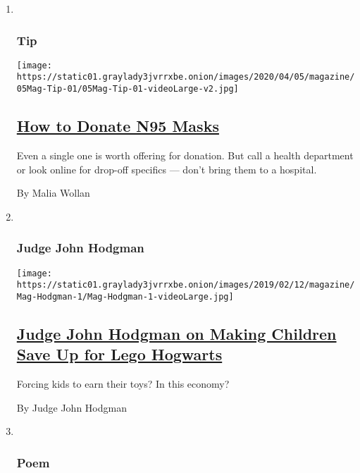 \begin{enumerate}
\def\labelenumi{\arabic{enumi}.}
\item ~
  \hypertarget{tip}{%
  \subsubsection{Tip}\label{tip}}

  \texttt{[image: https://static01.graylady3jvrrxbe.onion/images/2020/04/05/magazine/05Mag-Tip-01/05Mag-Tip-01-videoLarge-v2.jpg]}

  \hypertarget{how-to-donate-n95-masks}{%
  \subsection{\texorpdfstring{\href{/2020/03/30/magazine/how-to-donate-n95-masks-coronavirus.html}{How
  to Donate N95
  Masks}}{How to Donate N95 Masks}}\label{how-to-donate-n95-masks}}

  Even a single one is worth offering for donation. But call a health
  department or look online for drop-off specifics --- don't bring them
  to a hospital.

  By Malia Wollan
\item ~
  \hypertarget{judge-john-hodgman}{%
  \subsubsection{Judge John Hodgman}\label{judge-john-hodgman}}

  \texttt{[image: https://static01.graylady3jvrrxbe.onion/images/2019/02/12/magazine/Mag-Hodgman-1/Mag-Hodgman-1-videoLarge.jpg]}

  \hypertarget{judge-john-hodgman-on-making-children-save-up-for-lego-hogwarts}{%
  \subsection{\texorpdfstring{\href{/2020/04/03/magazine/judge-john-hodgman-on-making-children-save-up-for-lego-hogwarts.html}{Judge
  John Hodgman on Making Children Save Up for Lego
  Hogwarts}}{Judge John Hodgman on Making Children Save Up for Lego Hogwarts}}\label{judge-john-hodgman-on-making-children-save-up-for-lego-hogwarts}}

  Forcing kids to earn their toys? In this economy?

  By Judge John Hodgman
\item ~
  \hypertarget{poem}{%
  \subsubsection{Poem}\label{poem}}


\end{enumerate}
